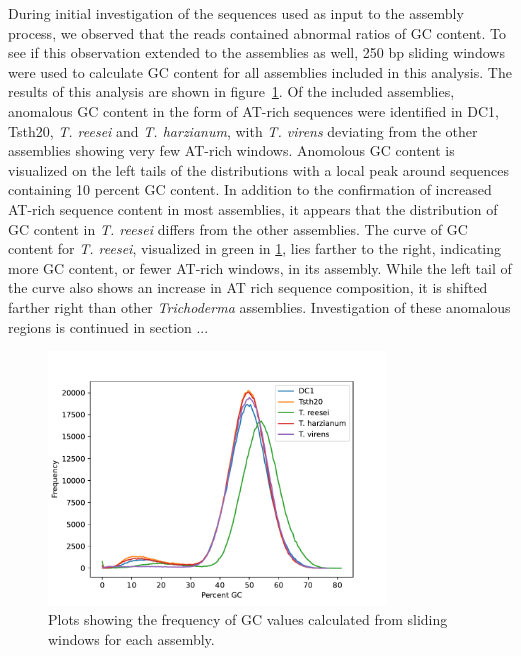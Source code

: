 During initial investigation of the sequences used as input to the
assembly process, we observed that the reads contained abnormal ratios
of GC content. To see if this observation extended to the assemblies
as well, 250 bp sliding windows were used to calculate GC content for
all assemblies included in this analysis. The results of this analysis
are shown in figure~\ref{fig:assembly-gc}. Of the included assemblies,
anomalous GC content in the form of AT-rich sequences were identified
in DC1, Tsth20, \textit{T. reesei} and \textit{T. harzianum}, with
\textit{T. virens} deviating from the other assemblies showing very
few AT-rich windows. Anomolous GC content is visualized on the left
tails of the distributions with a local peak around sequences
containing 10 percent GC content. In addition to the confirmation of
increased AT-rich sequence content in most assemblies, it appears that
the distribution of GC content in \textit{T. reesei} differs from the
other assemblies. The curve of GC content for \textit{T. reesei},
visualized in green in \ref{fig:assembly-gc}, lies farther to the
right, indicating more GC content, or fewer AT-rich windows, in its
assembly. While the left tail of the curve also shows an increase in
AT rich sequence composition, it is shifted farther right than other
\textit{Trichoderma} assemblies. Investigation of these anomalous
regions is continued in section ...

\begin{figure}
  \begin{center}
    \includegraphics[width=0.8\textwidth]{figures/gc-plot.pdf}
  \end{center}
  \caption{Plots showing the frequency of GC values calculated from
    sliding windows for each assembly.}
  \label{fig:assembly-gc}
\end{figure}


